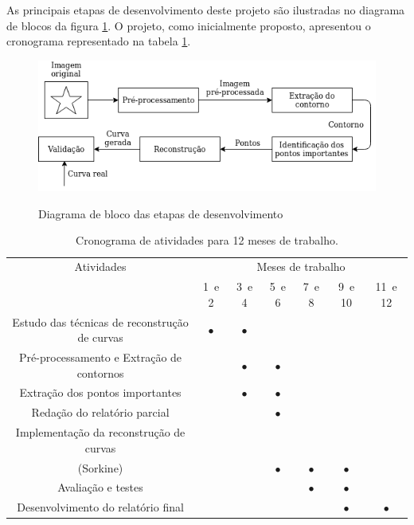 As principais etapas de desenvolvimento deste projeto são ilustradas no diagrama de blocos da figura \ref{fig:diagrama}. O projeto, como inicialmente proposto, apresentou o cronograma representado na tabela \ref{tab:cronograma}.

\begin{figure}[htb]
	\centering
	\caption{Diagrama de bloco das etapas de desenvolvimento}
	\includegraphics[width=.7\linewidth]{./img/diagrama.png}
	\label{fig:diagrama}
\end{figure}



\begin{table}[htb]
	\footnotesize
	\centering
	\vspace{0.5em}
	\setlength{\tabcolsep}{0.05in}
	\begin{tabular}{|c|c|c|c|c|c|c|}
		\hline
		Atividades
		& \multicolumn{6}{c|}{Meses de trabalho} \\
		\cline{2-7}
		& 1\textordmasculine\ e 2\textordmasculine & 3\textordmasculine\  e 4\textordmasculine & 5\textordmasculine\  e 6\textordmasculine & 7\textordmasculine\  e 8\textordmasculine & 9\textordmasculine\  e 10\textordmasculine & 11\textordmasculine\  e 12\textordmasculine \\ \hline
		Estudo das técnicas de reconstrução de curvas  & $\bullet$ & $\bullet$ & & & &\\ \hline
		Pré-processamento e Extração de contornos & & $\bullet$ & $\bullet$ & & & \\ \hline
		Extração dos pontos importantes & & $\bullet$ & $\bullet$ & & & \\ \hline
		Redação do relatório parcial & & & $\bullet$ & & & \\ \hline
		Implementação da reconstrução de curvas & & & & & & \\
		(Sorkine)& & & $\bullet$ & $\bullet$ & $\bullet$ & \\ \hline
		Avaliação e testes & & & & $\bullet$ & $\bullet$ & \\ \hline
		Desenvolvimento do relatório final & & & & & $\bullet$ & $\bullet$ \\ \hline
	\end{tabular}
	\caption{Cronograma de atividades para 12 meses de trabalho.}
	\label{tab:cronograma}
\end{table}

